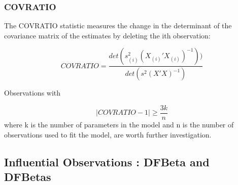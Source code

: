 \documentclass[residuals.tex]{subfiles}
\begin{document}
\subsubsection{COVRATIO}
The COVRATIO statistic measures the change in 
the determinant of the covariance matrix of the estimates by deleting the ith observation:

\[ COVRATIO = \frac{det ( s^2_{(i)} (X_{(i)}'X_{(i)})^{-1} ) )}{ det ( s^2 (X'X)^{-1} ) }  \]

Observations with

\[|{COVRATIO} - 1| \ge \frac{3k}{n}\]
where k is the number of parameters in the model and n is the number of observations used to fit the model, are worth further investigation.

%
%


\newpage

\subsection{Influential Observations : DFBeta and DFBetas}
\end{document}
